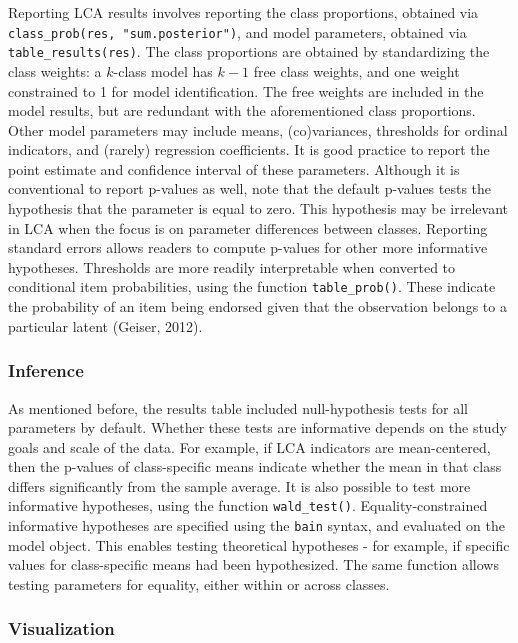 \documentclass[
  ,man,floatsintext]{apa6}
\begin{document}
Reporting LCA results involves reporting the class proportions,
obtained via \texttt{class\_prob(res,\ "sum.posterior")},
and model parameters, obtained via \texttt{table\_results(res)}.
The class proportions are obtained by standardizing the class weights:
a \(k\)-class model has \(k-1\) free class weights,
and one weight constrained to 1 for model identification.
The free weights are included in the model results,
but are redundant with the aforementioned class proportions.
Other model parameters may include means, (co)variances, thresholds for ordinal indicators, and (rarely) regression coefficients.
It is good practice to report the point estimate and confidence interval of these parameters.
Although it is conventional to report p-values as well,
note that the default p-values tests the hypothesis that the parameter is equal to zero.
This hypothesis may be irrelevant in LCA when the focus is on parameter differences between classes.
Reporting standard errors allows readers to compute p-values for other more informative hypotheses.
Thresholds are more readily interpretable when converted to conditional item probabilities, using the function \texttt{table\_prob()}.
These indicate the probability of an item being
endorsed given that the observation belongs to a particular latent (Geiser, 2012).

\hypertarget{inference}{%
\subsubsection{Inference}\label{inference}}

As mentioned before, the results table included null-hypothesis tests for all parameters by default.
Whether these tests are informative depends on the study goals and scale of the data.
For example, if LCA indicators are mean-centered,
then the p-values of class-specific means indicate whether the mean in that class differs significantly from the sample average.
It is also possible to test more informative hypotheses,
using the function \texttt{wald\_test()}.
Equality-constrained informative hypotheses are specified using the \texttt{bain} syntax,
and evaluated on the model object.
This enables testing theoretical hypotheses - for example, if specific values for class-specific means had been hypothesized.
The same function allows testing parameters for equality, either within or across classes.

\hypertarget{visualization}{%
\subsubsection{Visualization}\label{visualization}}
\end{document}
